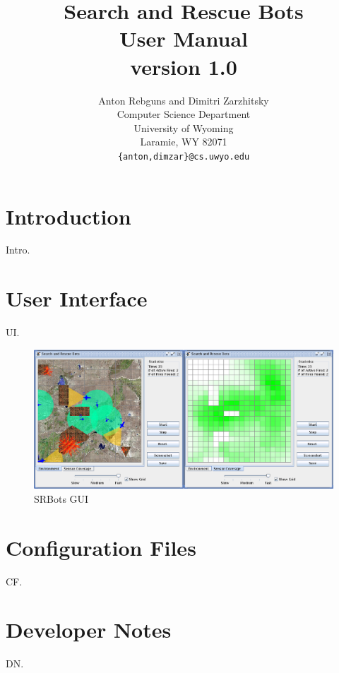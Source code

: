 \documentclass[12pt]{report}
\begin{document}
\title{{\bf Search and Rescue Bots} \\
       User Manual \\
       {\large version 1.0}}
\author{Anton Rebguns and Dimitri Zarzhitsky \\
        Computer Science Department \\
        University of Wyoming \\
	Laramie, WY  82071 \\
        {\small {\tt \{anton,dimzar\}@cs.uwyo.edu}}}
\maketitle

\tableofcontents


\chapter{Introduction}
Intro.


\chapter{User Interface}
UI.

\begin{figure}
\centering
\includegraphics[width=\textwidth]{srbots_gui}
\caption{SRBots GUI}
\label{fig:srbots_gui}
\end{figure}


\chapter{Configuration Files}
CF.


\chapter{Developer Notes}
DN.
\end{document}
